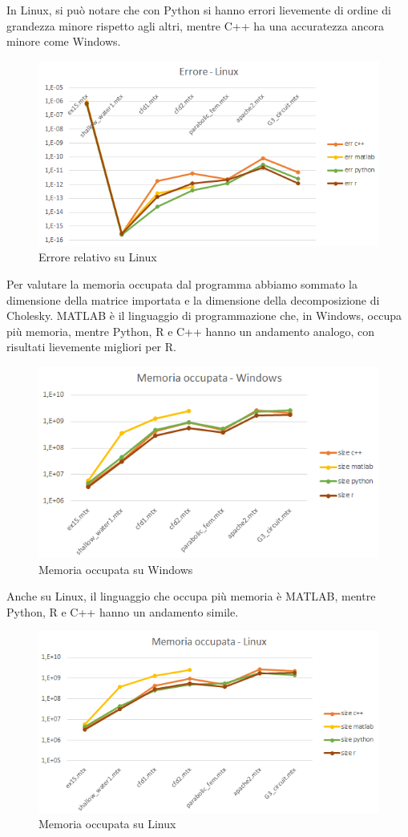 \documentclass[a4paper,12pt]{article}
\begin{document}
\noindent In Linux, si può notare che con Python si hanno errori lievemente di ordine di grandezza minore rispetto agli altri, mentre C++ ha una accuratezza ancora minore come Windows.
\bigskip
 
\begin{figure}[H]
\centering
  \includegraphics[width=0.75\linewidth]{img/errlinux.png}
\caption{Errore relativo su Linux}
\end{figure}

\noindent Per valutare la memoria occupata dal programma abbiamo sommato la dimensione della matrice importata e la dimensione della decomposizione di Cholesky. MATLAB è il linguaggio di programmazione che, in Windows, occupa più memoria, mentre Python, R e C++ hanno un andamento analogo, con risultati lievemente migliori per R.
\bigskip

\begin{figure}[H]
\centering
  \includegraphics[width=0.8\linewidth]{img/memoccwin.png}
\caption{Memoria occupata su Windows}
\end{figure}

\noindent Anche su Linux, il linguaggio che occupa più memoria è MATLAB, mentre Python, R e C++ hanno un andamento simile.
\bigskip

\begin{figure}[H]
\centering
  \includegraphics[width=0.8\linewidth]{img/memocclinux.png}
\caption{Memoria occupata su Linux}
\end{figure}
\end{document}
